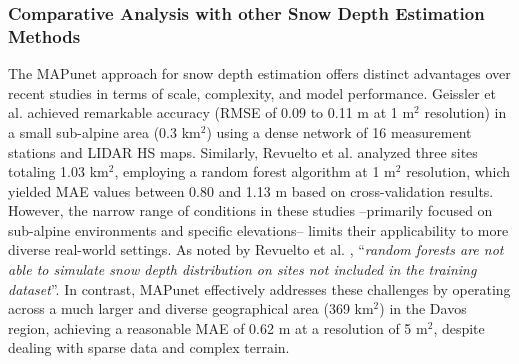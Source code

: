 \documentclass[preprint,12pt]{elsarticle}
\begin{document}
\subsubsection{Comparative Analysis with other Snow Depth Estimation Methods}

The MAPunet approach for snow depth estimation offers distinct advantages over recent studies in terms of scale, complexity, and model performance. Geissler et al. \cite{Geissler2023} achieved remarkable accuracy (RMSE of 0.09 to 0.11 m at 1 m$^2$ resolution) in a small sub-alpine area (0.3 km$^2$) using a dense network of 16 measurement stations and LIDAR HS maps. Similarly, Revuelto et al. \cite{revuelto2020random} analyzed three sites totaling 1.03 km$^2$, employing a random forest algorithm at 1 m$^2$ resolution, which yielded MAE values between 0.80 and 1.13 m based on cross-validation results. However, the narrow range of conditions in these studies --primarily focused on sub-alpine environments and specific elevations-- limits their applicability to more diverse real-world settings. As noted by Revuelto et al. \cite{revuelto2020random}, ``\textit{random forests are not able to simulate snow depth distribution on sites not included in the training dataset}''. In contrast, MAPunet effectively addresses these challenges by operating across a much larger and diverse geographical area (369 km$^2$) in the Davos region, achieving a reasonable MAE of 0.62 m at a resolution of 5 m$^2$, despite dealing with sparse data and complex terrain.

\end{document}
